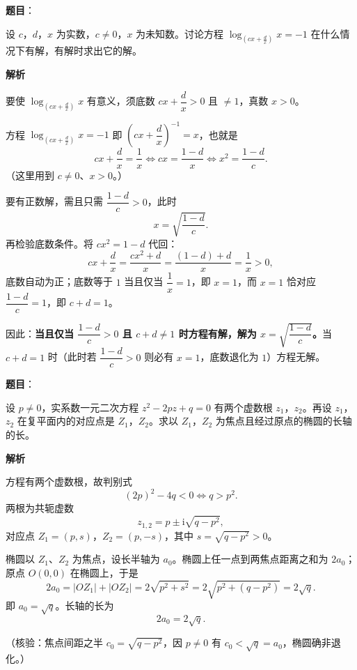 \begin{answer}

\textbf{题目}：

设 $c$，$d$，$x$ 为实数，$c\ne0$，$x$ 为未知数。讨论方程 $\log_{\left(cx+\frac dx\right)}x=-1$ 在什么情况下有解，有解时求出它的解。

\textbf{解析}

要使 $\log_{\left(cx+\frac dx\right)}x$ 有意义，须底数 $cx+\dfrac dx>0$ 且 $\ne1$，真数 $x>0$。

方程 $\log_{\left(cx+\frac dx\right)}x=-1$ 即 $\left(cx+\dfrac dx\right)^{-1}=x$，也就是
\nopagebreak[4]
\[
cx+\frac dx=\frac1x\iff cx=\frac{1-d}{x}\iff x^2=\frac{1-d}{c}.
\]
（这里用到 $c\ne0$、$x>0$。）

要有正数解，需且只需 $\dfrac{1-d}{c}>0$，此时
\nopagebreak[4]
\[
x=\sqrt{\frac{1-d}{c}}.
\]
再检验底数条件。将 $cx^2=1-d$ 代回：
\nopagebreak[4]
\[
cx+\frac dx=\frac{cx^2+d}{x}=\frac{(1-d)+d}{x}=\frac1x>0,
\]
底数自动为正；底数等于 $1$ 当且仅当 $\dfrac1x=1$，即 $x=1$，而 $x=1$ 恰对应 $\dfrac{1-d}{c}=1$，即 $c+d=1$。

因此：\textbf{当且仅当 $\dfrac{1-d}{c}>0$ 且 $c+d\ne1$ 时方程有解，解为 $x=\sqrt{\dfrac{1-d}{c}}$。}当 $c+d=1$ 时（此时若 $\dfrac{1-d}{c}>0$ 则必有 $x=1$，底数退化为 $1$）方程无解。


\end{answer}
\begin{answer}

\textbf{题目}：

设 $p\ne0$，实系数一元二次方程 $z^2-2pz+q=0$ 有两个虚数根 $z_1$，$z_2$。再设 $z_1$，$z_2$ 在复平面内的对应点是 $Z_1$，$Z_2$。求以 $Z_1$，$Z_2$ 为焦点且经过原点的椭圆的长轴的长。

\textbf{解析}

方程有两个虚数根，故判别式
\nopagebreak[4]
\[
(2p)^2-4q<0\iff q>p^2.
\]
两根为共轭虚数
\nopagebreak[4]
\[
z_{1,2}=p\pm \mathrm i\sqrt{q-p^2},
\]
对应点 $Z_1=(p,s)$，$Z_2=(p,-s)$，其中 $s=\sqrt{q-p^2}>0$。

椭圆以 $Z_1$、$Z_2$ 为焦点，设长半轴为 $a_0$。椭圆上任一点到两焦点距离之和为 $2a_0$；原点 $O(0,0)$ 在椭圆上，于是
\nopagebreak[4]
\[
2a_0=|OZ_1|+|OZ_2|=2\sqrt{p^2+s^2}=2\sqrt{p^2+(q-p^2)}=2\sqrt q.
\]
即 $a_0=\sqrt q$。长轴的长为
\nopagebreak[4]
\[
2a_0=2\sqrt q.
\]

（核验：焦点间距之半 $c_0=\sqrt{q-p^2}$，因 $p\ne0$ 有 $c_0<\sqrt q=a_0$，椭圆确非退化。）


\end{answer}
